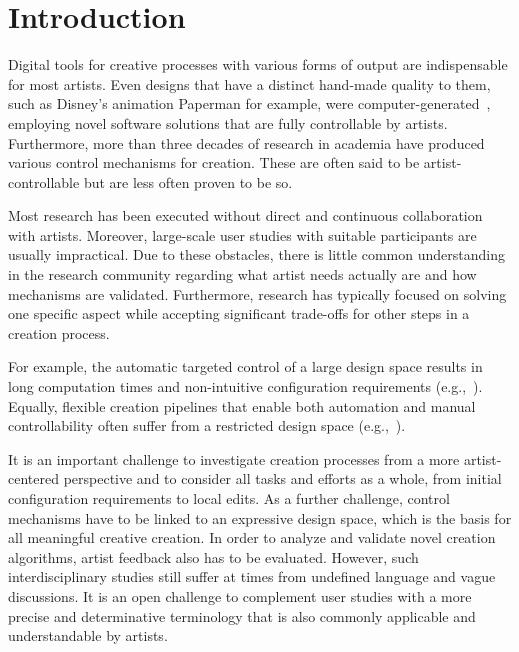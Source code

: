 


\section{Introduction}

Digital tools for creative processes with various forms of output are indispensable for most artists. Even designs that have a distinct hand-made quality to them, such as Disney's animation Paperman for example, were computer-generated~\cite{disney_2012_ppm}, employing novel software solutions that are fully controllable by artists. Furthermore, more than three decades of research in academia have produced various control mechanisms for creation. These are often said to be artist-controllable but are less often proven to be so.

Most research has been executed without direct and continuous collaboration with artists. Moreover, large-scale user studies with suitable participants are usually impractical. Due to these obstacles, there is little common understanding in the research community regarding what artist needs actually are and how mechanisms are validated. Furthermore, research has typically focused on solving one specific aspect while accepting significant trade-offs for other steps in a creation process.

For example, the automatic targeted control of a large design space results in long computation times and non-intuitive configuration requirements (e.g.,~\cite{bourque_2004_ptm, wong_1998_cgf}). Equally, flexible creation pipelines that enable both automation and manual controllability often suffer from a restricted design space (e.g.,~\cite{santoni_2016_ggp}).  

It is an important challenge to investigate creation processes from a more artist-centered perspective and to consider all tasks and efforts as a whole, from initial configuration requirements to local edits. As a further challenge, control mechanisms have to be linked to an expressive design space, which is the basis for all meaningful creative creation. In order to analyze and validate novel creation algorithms, artist feedback also has to be evaluated. However, such interdisciplinary studies still suffer at times from undefined language and vague discussions. It is an open challenge to complement user studies with a more precise and determinative terminology that is also commonly applicable and understandable by artists.


